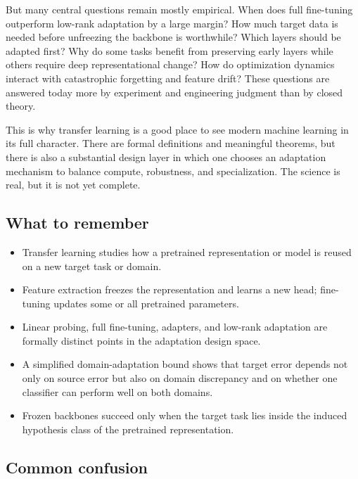 But many central questions remain mostly empirical.
When does full fine-tuning outperform low-rank adaptation by a large margin?
How much target data is needed before unfreezing the backbone is worthwhile?
Which layers should be adapted first?
Why do some tasks benefit from preserving early layers while others require deep representational change?
How do optimization dynamics interact with catastrophic forgetting and feature drift?
These questions are answered today more by experiment and engineering judgment than by closed theory.

This is why transfer learning is a good place to see modern machine learning in its full character.
There are formal definitions and meaningful theorems, but there is also a substantial design layer in which one chooses an adaptation mechanism to balance compute, robustness, and specialization.
The science is real, but it is not yet complete.

\subsection*{What to remember}

\begin{itemize}
    \item Transfer learning studies how a pretrained representation or model is reused on a new target task or domain.
    \item Feature extraction freezes the representation and learns a new head; fine-tuning updates some or all pretrained parameters.
    \item Linear probing, full fine-tuning, adapters, and low-rank adaptation are formally distinct points in the adaptation design space.
    \item A simplified domain-adaptation bound shows that target error depends not only on source error but also on domain discrepancy and on whether one classifier can perform well on both domains.
    \item Frozen backbones succeed only when the target task lies inside the induced hypothesis class of the pretrained representation.
\end{itemize}

\subsection*{Common confusion}

